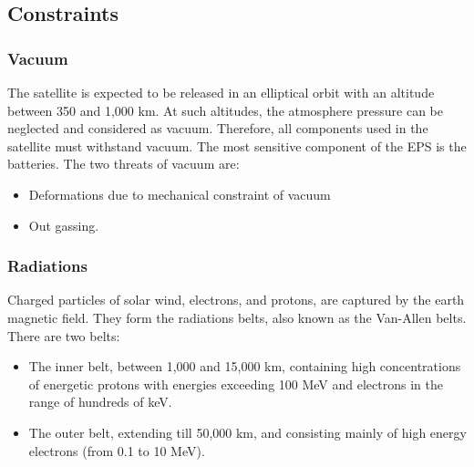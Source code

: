 \subsection{Constraints} 

\subsubsection*{Vacuum}

The satellite is expected to be released in an elliptical orbit with an altitude between 350 and 1,000 km. At such altitudes, the atmosphere pressure can be neglected and considered as vacuum. Therefore, all components used in the satellite must withstand vacuum. The most sensitive component of the EPS is the batteries. The two threats of vacuum are:
\begin{itemize}
\item Deformations due to mechanical constraint of vacuum
\item Out gassing.
\end{itemize}

\subsubsection*{Radiations}

Charged particles of solar wind, electrons, and protons, are captured by the earth magnetic field. They form the radiations belts, also known as the Van-Allen belts. There are two belts:
\begin{itemize}
\item The inner belt, between 1,000 and 15,000 km, containing high concentrations of energetic protons with energies exceeding 100 MeV and electrons in the range of hundreds of keV.
\item The outer belt, extending till 50,000 km, and consisting mainly of high energy electrons (from 0.1 to 10 MeV).
\end{itemize}

